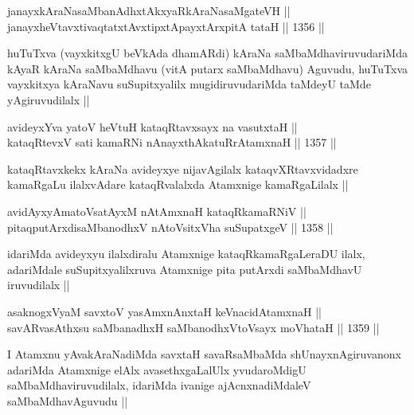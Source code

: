 
\begin{shl}
janayxkAraNasaMbanAdhxtAkxyaRkAraNasaMgateVH || \\
janayxheVtavxtivaqtatxtAvxtipxtA\s payxtArxpitA tataH ||  1356 ||  
\end{shl}

\begin{artha}
huTuTxva (vayxkitxgU beVkAda dhamARdi) kAraNa saMbaMdhaviruvudariMda kAyaR kAraNa saMbaMdhavu (vitA putarx saMbaMdhavu) Aguvudu, huTuTxva vayxkitxya kAraNavu suSupitxyalilx mugidiruvudariMda taMdeyU taMde yAgiruvudilalx ||
\end{artha}


\begin{shl}
avideyxYva yatoV heVtuH kataqRtavxsayx na vasutxtaH ||  \\
kataqRtevxV sati kamaRNi nAnayxthA\s katuRrAtamxnaH ||  1357 ||  
\end{shl}

\begin{artha}
kataqRtavxkekx kAraNa avideyxye nijavAgilalx kataqvXRtavxvidadxre kamaRgaLu ilalxvAdare kataqRvalalxda Atamxnige kamaRgaLilalx ||
\end{artha}

\begin{shl}
avidAyxyAmatoV\s satAyxM nA\s \s tAmxnaH kataqRkamaRNiV || \\
pitaqputArxdisaMbanodhxV nAtoV\s sitxVha suSupatxgeV ||  1358 ||  
\end{shl}

\begin{artha}
idariMda avideyxyu ilalxdiralu Atamxnige kataqRkamaRgaLeraDU ilalx, adariMdale suSupitxyalilxruva Atamxnige pita putArxdi saMbaMdhavU iruvudilalx ||
\end{artha}


\begin{shl}
asaknogxV\s yaM savxtoV yasAmxnAnxtaH keVnacidAtamxnaH || \\
savARvasAthxsu saMbanadhxH saMbanodhxV\s toV\s sayx moVhataH ||  1359 ||  
\end{shl}

\begin{artha}
I Atamxnu yAvakAraNadiMda savxtaH savaRsaMbaMda shUnayxnAgiruvanonx adariMda Atamxnige elAlx avasethxgaLalUlx yvudaroMdigU saMbaMdhaviruvudilalx, idariMda ivanige ajAcnxnadiMdaleV saMbaMdhavAguvudu ||
\end{artha}

